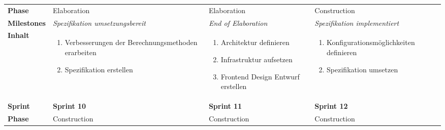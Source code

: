 \begin{landscape}
\begin{longtable}{l p{6.5cm} p{6.5cm} p{6.5cm}}
        \midrule
        \textbf{Phase}
                                & Elaboration
                                & Elaboration
                                & Construction \\

        \textbf{Milestones}
                                & \textit{Spezifikation umsetzungsbereit}
                                & \textit{End of Elaboration}
                                & \textit{Spezifikation implementiert}  \\

        \textbf{Inhalt}
                                & \begin{enumerate}[noitemsep]
                                    \item Verbesserungen der Berechnungsmethoden erarbeiten
                                    \item Spezifikation erstellen
                                \end{enumerate}
                                & \begin{enumerate}[noitemsep]
                                    \item Architektur definieren
                                    \item Infrastruktur aufsetzen
                                    \item Frontend Design Entwurf erstellen
                                \end{enumerate}
                                & \begin{enumerate}[noitemsep]
                                    \item Konfigurationsmöglichkeiten definieren
                                    \item Spezifikation umsetzen
                                \end{enumerate} \\

        \toprule
        \textbf{Sprint}
                                & \textbf{Sprint 10}
                                & \textbf{Sprint 11}
                                & \textbf{Sprint 12} \\

        \midrule
        \textbf{Phase}
                                & Construction
                                & Construction
                                & Construction \\


\end{longtable}
\end{landscape}
